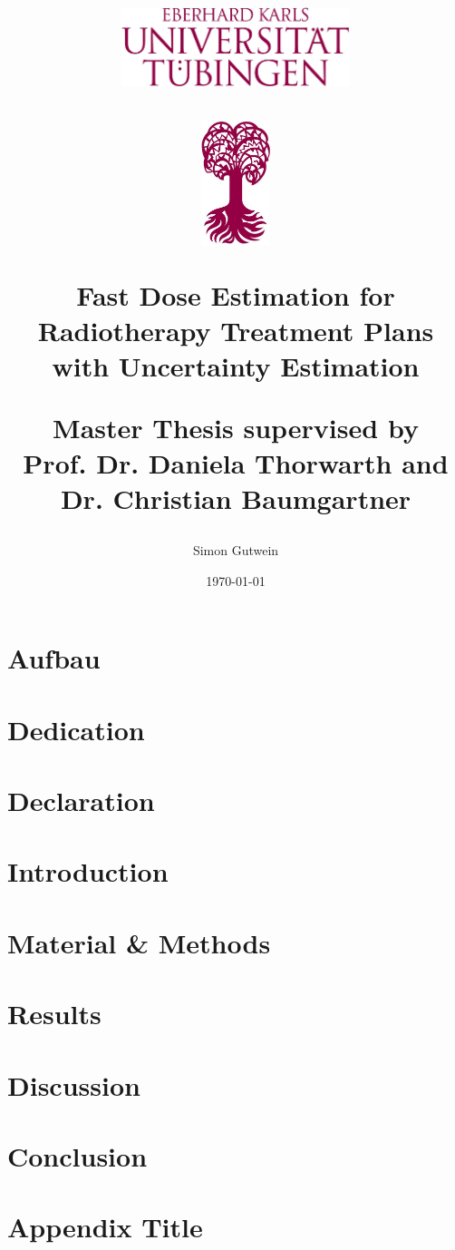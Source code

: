 \documentclass[12pt]{report}
\title{
	\centering
	\includegraphics[width=0.5\textwidth]{logo4}\par\vspace{1cm}
	\includegraphics[width=0.15\textwidth]{logo3}\par\vspace{1cm}
	{\huge\bfseries Fast Dose Estimation for Radiotherapy Treatment Plans with Uncertainty Estimation\par}
	\vspace{1cm}
	{\fontsize{20.74}{0}\selectfont Master Thesis}\vspace{3cm}
	\vfill
	{\fontsize{17}{18}\selectfont supervised by \fontsize{17}{18}\selectfont\\ Prof. Dr. Daniela Thorwarth and Dr. Christian Baumgartner}
	\vfill
}
\author{Simon Gutwein}
\date{\today}
\begin{document}
\maketitle

\chapter{Aufbau}


% 

\chapter{Dedication}


\chapter{Declaration}


\tableofcontents
\listoffigures
\listoftables

\chapter{Introduction}


\chapter{Material \& Methods}


\chapter{Results}


\chapter{Discussion}


\chapter{Conclusion}


\printbibliography
\appendix
\chapter{Appendix Title}

\end{document}

